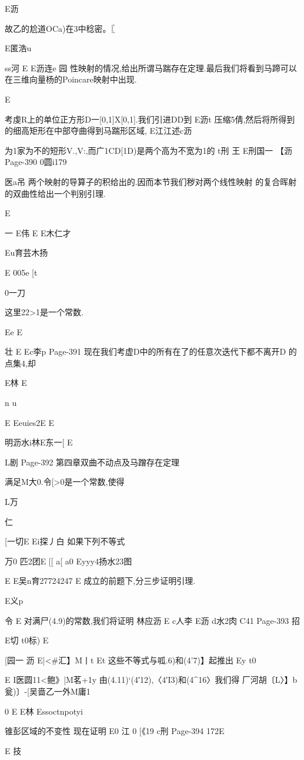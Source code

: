 {{{{{{{{{{{{E沥

故乙的尬道OCa)在3中稔密。〖

E匿浩u

ss河
E
E沥连e
园
性映射的情况,给出所谓马踹存在定理.最后我们将看到马蹄可以
在三维向量杨的Poincare映射中出现.

E

考虔R上的单位正方形D一[0,1]X[0,1].我们引进DD到
E沥t
压缩5倩,然后将所得到的细高矩形在中部夺曲得到马踹形区域,
E江江述c沥

为1家为不的短形V.,V:,而广1CD[1D)是两个高为不宽为1的
t刑
王
E刑国一
【沥
Page-390
0圆i179

医a吊
两个映射的导算子的积给出的.因而本节我们秽对两个线性映射
的复合晖射的双曲性给出一个判别引理.

E

一
E伟
E
E木仁才

Eu育芸木扬

E
005e
[t

0一刀

这里22>1是一个常数.

Ee
E

壮
E
Ec李p
Page-391
现在我们考虚D中的所有在了的任意次迭代下都不离开D
的点集4,却

E林
E

n
u

E
Eeuies2E
E

明沥水i林E东一[
E

L剧
Page-392
第四章双曲不动点及马蹭存在定理

满足M大0.令[>0是一个常数,使得

L万

仁

[一切E
Ei探丿白
如果下列不等式

万0
匹2团E
[[
a[
a0
Eyyy4扬水23图

E
E吴n育27724247
E
成立的前题下,分三步证明引理.

E义p

令
E
对满尸(4.9)的常数,我们将证明
林应沥
E
c人李
E沥
d水2肉
C41
Page-393
招

E切
t0标)
E

[园一
沥
E|<#汇】M丨t
Et
这些不等式与呱.6)和(4'7)】起推出
Ey
t0

E
I医圆11<鲍》|M茗+1y
由(4.11)`(4′12),〈4′I3)和(4^16〉我们得
厂河胡〔L〉】b瓮)〕-[吴啬乙一外M庸1

0
E
E林
Essoctnpotyi

锥彭区域的不变性
现在证明
E0
江
0
[《19
c刑
Page-394
172E

E
技

}}}}}}}}}}}}
